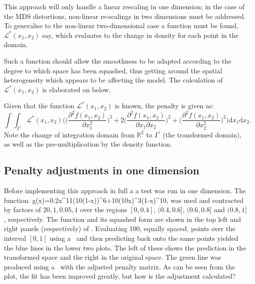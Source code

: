 This approach will only handle a linear rescaling in one dimension; in the case of the MDS distortions, non-linear re-scalings in two dimensions must be addressed. To generalise  to the non-linear two-dimensional case a function must be found, $\mathcal{L}^*(x_1,x_2)$ say, which evaluates to the change in density for each point in the domain. 

Such a function should allow the smoothness to be adapted according to the degree to which space has been squashed, thus getting around the spatial heterogeneity which appears to be affecting the model. The calculation of $\mathcal{L}^*(x_1,x_2)$ is elaborated on below.

Given that the function $\mathcal{L}^*(x_1,x_2)$ is known, the penalty is given as:
\begin{equation}
\int\int_{\Gamma^\prime} \mathcal{L}^*(x_1,x_2) \Big( \Big(\frac{\partial^2 f(x_1,x_2)}{\partial x_1^2}\Big)^2 + 2\Big(\frac{\partial^2 f(x_1,x_2)}{\partial x_1 \partial x_2}\Big)^2 + \Big(\frac{\partial^2 f(x_1,x_2)}{\partial x_2^2}\Big)^2\Big) \text{d}x_1 \text{d}x_2.
\label{kdeadjust}
\end{equation}
Note the change of integration domain from $\mathbb{R}^2$ to $\Gamma^\prime$ (the transformed domain), as well as the pre-multiplication by the density function.

\subsection{Penalty adjustments in one dimension}

Before implementing this approach in full a a test was run in one dimension. The function:
\be
g(x)=0.2x^{11}(10(1-x))^6+10(10x)^3(1-x)^{10},
\label{hardfcn}
\ee
was used and contracted by factors of $20,1,0.05,1$ over the regions $[0,0.4]$, $(0.4,0.6]$, $(0.6,0.8]$ and $(0.8,1]$, respectively. The function and its squashed form are shown in the top left and right panels (respectively) of . Evaluating 100, equally spaced, points over the interval $[0,1]$ using a \tprs\ and then predicting back onto the same points yielded the blue lines in the lower two plots. The left of these shows the prediction in the transformed space and the right in the original space. The green line was produced using a \tprs\ with the adjusted penalty matrix. As can be seen from the plot, the fit has been improved greatly, but how is the adjustment calculated?

